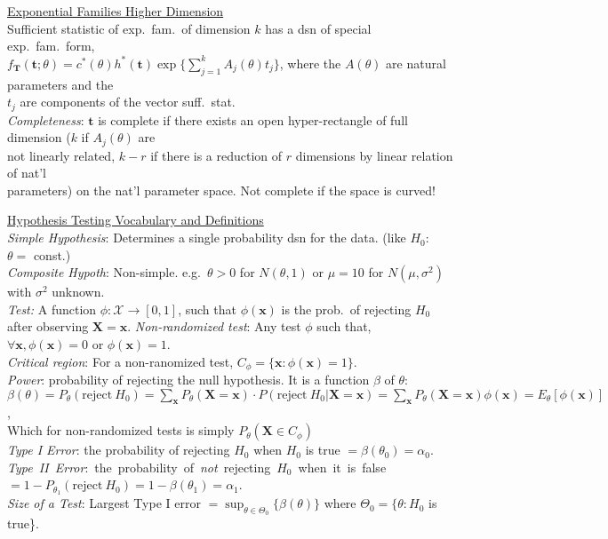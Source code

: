 \documentclass[11pt]{article}
\newcommand{\vecX}{\ensuremath{\mathbf{X}}}
\newcommand{\vecx}{\ensuremath{\mathbf{x}}}
\begin{document}
\indent\underline{Exponential Families Higher Dimension}\\ Sufficient statistic of exp.\
fam.\ of dimension $k$ has a dsn of special exp.\ fam.\ form,\\
\hspace*{1.5em}\mbox{$f_\mathbf{T} (\mathbf{t};\theta) =
c^*(\theta)h^*(\mathbf{t})\exp\{\sum_{j=1}^k A_j(\theta) t_j\}$}, where the
$A(\theta)$ are natural parameters and the \\
\hspace*{1.5em}$t_j$ are components of the vector suff.\ stat.\\
%
{\it Completeness}: $\mathbf{t}$ is complete if there exists an open hyper-rectangle of full
dimension ($k$ if $A_j(\theta)$ are \\
\hspace*{1.5em}not linearly related, $k-r$ if there is a reduction of $r$
dimensions by linear relation of nat'l \\
\hspace*{1.5em}parameters) on the nat'l parameter space.  Not complete if
the space is curved!

\indent\underline{Hypothesis Testing Vocabulary and Definitions}\\
{\it Simple Hypothesis}: Determines a single probability dsn for the data. (like $H_0$: $\theta =$
const.)\\
{\it Composite Hypoth}: Non-simple. e.g.\ $\theta > 0$ for $N(\theta,1)$ or $\mu = 10$ for
$N(\mu,\sigma^2)$ with $\sigma^2$ unknown.\\
{\it Test:} A function $\phi : \mathcal{X}\rightarrow [0,1]$, such that $\phi(\vecx)$ is the prob.\
of rejecting $H_0$ after observing $\vecX=\vecx$.
{\it Non-randomized test}: Any test $\phi$ such that, $\forall \vecx , \phi(\vecx) = 0$ or
$\phi(\vecx) = 1$.\\
{\it Critical region}: For a non-ranomized test, $C_\phi = \{\vecx : \phi(\vecx) = 1\}$.\\
{\it Power}: probability of rejecting the null hypothesis.  It is a function $\beta$ of $\theta$:\\
\hspace*{1.5 em}$\beta (\theta) = P_\theta (\mathrm{reject}\ H_0) = \sum_\vecx
P_\theta (\vecX=\vecx)\cdot P(\mathrm{reject}\ H_0 | \vecX=\vecx) = \sum_\vecx
P_\theta(\vecX=\vecx)\phi (\vecx) = E_\theta [\phi(\vecx)]$,\\
\hspace*{1.5 em}Which for non-randomized tests is simply $P_\theta (\vecX \in C_\phi)$\\
{\it Type I Error}: the probability of rejecting $H_0$ when $H_0$ is true $= \beta (\theta_0)
=\alpha_0$.\\
\mbox{{\it Type II Error}: the probability of {\it not} rejecting $H_0$ when it is false $=
1-P_{\theta_1} (\mathrm{reject}\ H_0) = 1-\beta(\theta_1) = \alpha_1$.}\\
{\it Size of a Test}: Largest Type I error $= \sup_{\theta\in\Theta_0}\{\beta(\theta)\}$ where
$\Theta_0 = \{\theta : H_0$ is true\}.
\end{document}
